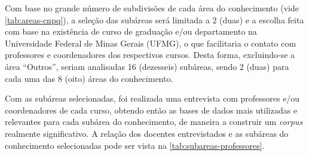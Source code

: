 Com base no grande número de subdivisões de cada área do conhecimento (vide \autoref{tab:areas-cnpq}), a seleção das subáreas será limitada a 2 (duas) e a escolha feita com base na existência de curso de graduação e/ou departamento na Universidade Federal de Minas Gerais (UFMG), o que facilitaria o contato com professores e coordenadores dos respectivos cursos. Desta forma, excluindo-se a área ``Outros'', seriam analisadas 16 (dezesseis) subáreas, sendo 2 (duas) para cada uma das 8 (oito) áreas do conhecimento.

Com as subáreas selecionadas, foi realizada uma entrevista com professores e/ou coordenadores de cada curso, obtendo então as bases de dados mais utilizadas e relevantes para cada subárea do conhecimento, de maneira a construir um \emph{corpus} realmente significativo. A relação dos docentes entrevistados e as subáreas do conhecimento selecionadas pode ser vista na \autoref{tab:subareas-professores}.

